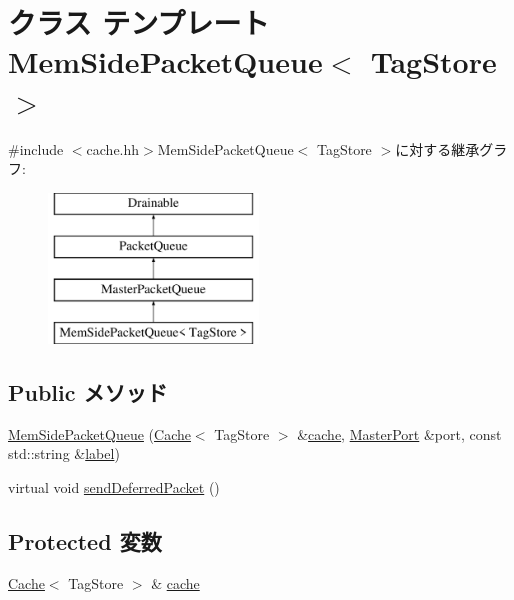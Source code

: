 \hypertarget{classCache_1_1MemSidePacketQueue}{
\section{クラス テンプレート MemSidePacketQueue$<$ TagStore $>$}
\label{classCache_1_1MemSidePacketQueue}
}


{\ttfamily \#include $<$cache.hh$>$}MemSidePacketQueue$<$ TagStore $>$に対する継承グラフ:\begin{figure}[H]
\begin{center}
\leavevmode
\includegraphics[height=4cm]{classCache_1_1MemSidePacketQueue}
\end{center}
\end{figure}
\subsection*{Public メソッド}
\begin{DoxyCompactItemize}
\item 
\hyperlink{classCache_1_1MemSidePacketQueue_af98f7e700e64b2c5f5bd8f96b7368b0a}{MemSidePacketQueue} (\hyperlink{classCache}{Cache}$<$ TagStore $>$ \&\hyperlink{classCache_1_1MemSidePacketQueue_adf2b34ffa42914b9356a0788fc109bcc}{cache}, \hyperlink{classMasterPort}{MasterPort} \&port, const std::string \&\hyperlink{classPacketQueue_ae471a4c4073716b769170188214fe93d}{label})
\item 
virtual void \hyperlink{classCache_1_1MemSidePacketQueue_a3ce3f4b79c2caf000124b3de8ba9157c}{sendDeferredPacket} ()
\end{DoxyCompactItemize}
\subsection*{Protected 変数}
\begin{DoxyCompactItemize}
\item 
\hyperlink{classCache}{Cache}$<$ TagStore $>$ \& \hyperlink{classCache_1_1MemSidePacketQueue_adf2b34ffa42914b9356a0788fc109bcc}{cache}
\end{DoxyCompactItemize}


